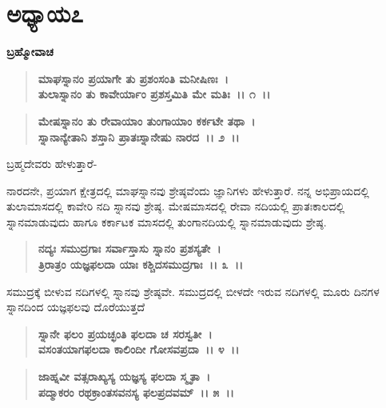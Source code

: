 \newpage

\section*{ಅಧ್ಯಾಯ\enginline{-}೭}

\emptypage

\begin{flushleft}
\textbf{ಬ್ರಹ್ಮೋವಾಚ\enginline{-} }
\end{flushleft}

\begin{verse}
\textbf{ಮಾಘಸ್ನಾನಂ ಪ್ರಯಾಗೇ ತು ಪ್ರಶಂಸಂತಿ ಮನೀಷಿಣಃ~।}\\\textbf{ತುಲಾಸ್ನಾನಂ ತು ಕಾವೇರ್ಯಾಂ ಪ್ರಶಸ್ತಮಿತಿ ಮೇ ಮತಿಃ~।। ೧~।। }
\end{verse}

\begin{verse}
\textbf{ಮೇಷಸ್ನಾನಂ ತು ರೇವಾಯಾಂ ತುಂಗಾಯಾಂ ಕರ್ಕಟೇ ತಥಾ~।}\\\textbf{ಸ್ನಾನಾನ್ಯೇತಾನಿ ಶಸ್ತಾನಿ ಪ್ರಾತಃಸ್ನಾನೇಷು ನಾರದ~।। ೨~।।}
\end{verse}

\begin{flushleft}
 ಬ್ರಹ್ಮದೇವರು ಹೇಳುತ್ತಾರೆ- 
\end{flushleft}

ನಾರದನೇ, ಪ್ರಯಾಗ ಕ್ಷೇತ್ರದಲ್ಲಿ ಮಾಘಸ್ನಾನವು ಶ್ರೇಷ್ಠವೆಂದು ಜ್ಞಾನಿಗಳು ಹೇಳುತ್ತಾರೆ. ನನ್ನ ಅಭಿಪ್ರಾಯದಲ್ಲಿ ತುಲಾಮಾಸದಲ್ಲಿ ಕಾವೇರಿ ನದಿ ಸ್ನಾನವು ಶ್ರೇಷ್ಠ. ಮೇಷಮಾಸದಲ್ಲಿ ರೇವಾ ನದಿಯಲ್ಲಿ ಪ್ರಾತಃಕಾಲದಲ್ಲಿ ಸ್ನಾನಮಾಡುವುದು ಹಾಗೂ ಕರ್ಕಾಟಕ ಮಾಸದಲ್ಲಿ ತುಂಗಾನದಿಯಲ್ಲಿ ಸ್ನಾನಮಾಡುವುದು ಶ್ರೇಷ್ಠ.

\begin{verse}
\textbf{ನದ್ಯಃ ಸಮುದ್ರಗಾಃ ಸರ್ವಾಸ್ತಾಸು ಸ್ನಾನಂ ಪ್ರಶಸ್ಯತೇ~।}\\\textbf{ತ್ರಿರಾತ್ರಂ ಯಜ್ಞಫಲದಾ ಯಾಃ ಕಶ್ಚಿದಸಮುದ್ರಗಾಃ~।। ೩~।। }
\end{verse}

ಸಮುದ್ರಕ್ಕೆ ಬೀಳುವ ನದಿಗಳಲ್ಲಿ ಸ್ನಾನವು ಶ್ರೇಷ್ಠವೇ. ಸಮುದ್ರದಲ್ಲಿ ಬೀಳದೇ ಇರುವ ನದಿಗಳಲ್ಲಿ ಮೂರು ದಿನಗಳ ಸ್ನಾನದಿಂದ ಯಜ್ಞಫಲವು ದೊರೆಯುತ್ತದೆ

\begin{verse}
\textbf{ಸ್ನಾನೇ ಫಲಂ ಪ್ರಯಚ್ಛಂತಿ ಫಲದಾ ಚ ಸರಸ್ವತೀ~।}\\\textbf{ವಸಂತಯಾಗಫಲದಾ ಕಾಲಿಂದೀ ಗೋಸವಪ್ರದಾ~।। ೪~।।} 
\end{verse}

\begin{verse}
\textbf{ಜಾಹ್ನವೀ ವತ್ಸರಾಖ್ಯಸ್ಯ ಯಜ್ಞಸ್ಯ ಫಲದಾ ಸ್ಮೃತಾ~।}\\\textbf{ಪದ್ಮಾಕರಂ ರಥಕ್ರಾಂತಸವನಸ್ಯ ಫಲಪ್ರದವಮ್~।। ೫~।।} 
\end{verse}

